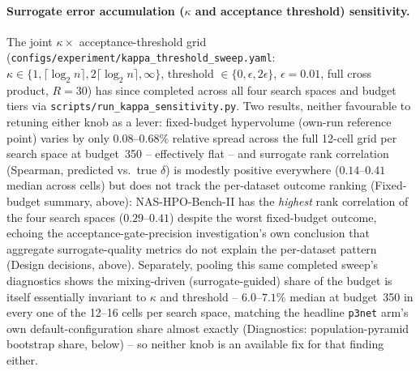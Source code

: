 \paragraph{Surrogate error accumulation ($\kappa$ and acceptance threshold) sensitivity.} The joint
$\kappa \times$ acceptance-threshold grid (\texttt{configs/experiment/kappa\_threshold\_sweep.yaml}: $\kappa
\in \{1, \lceil\log_2 n\rceil, 2\lceil\log_2 n\rceil, \infty\}$, threshold $\in \{0, \epsilon, 2\epsilon\}$,
$\epsilon = 0.01$, full cross product, $R=30$) has since completed across all four search spaces and budget
tiers via \texttt{scripts/run\_kappa\_sensitivity.py}. Two results, neither favourable to retuning either
knob as a lever: fixed-budget hypervolume (own-run reference point) varies by only $0.08$--$0.68\%$ relative
spread across the full 12-cell grid per search space at budget~350 -- effectively flat -- and surrogate rank
correlation (Spearman, predicted vs.\ true $\delta$) is modestly positive everywhere ($0.14$--$0.41$
median across cells) but does not track the per-dataset outcome ranking (Fixed-budget summary, above):
NAS-HPO-Bench-II has the \emph{highest} rank correlation of the four search spaces ($0.29$--$0.41$) despite
the worst fixed-budget outcome, echoing the acceptance-gate-precision investigation's own conclusion that
aggregate surrogate-quality metrics do not explain the per-dataset pattern (Design decisions, above).
Separately, pooling this same completed sweep's diagnostics shows the mixing-driven (surrogate-guided)
share of the budget is itself essentially invariant to $\kappa$ and threshold -- $6.0$--$7.1\%$ median at
budget~350 in every one of the 12--16 cells per search space, matching the headline \texttt{p3net} arm's own
default-configuration share almost exactly (Diagnostics: population-pyramid bootstrap share, below) -- so
neither knob is an available fix for that finding either.

